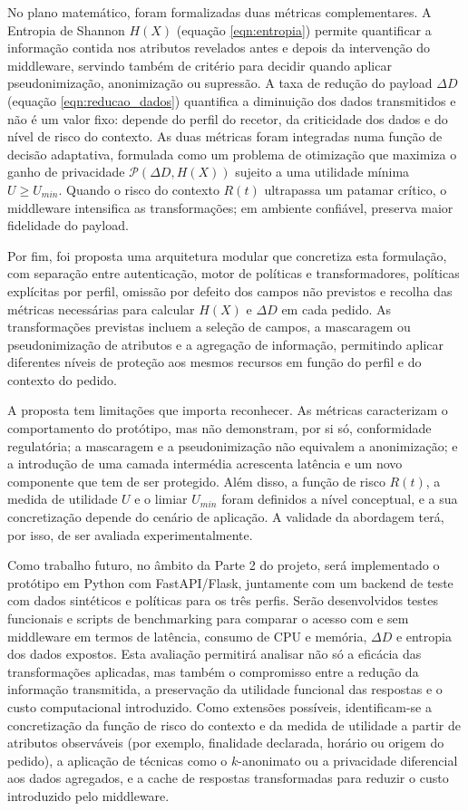 \documentclass[12pt,reqno, twoside]{amsbook}
\theoremstyle{plain}
\numberwithin{equation}{chapter}
\numberwithin{table}{chapter}
\numberwithin{figure}{chapter}
\numberwithin{section}{chapter}
\begin{document}
\noindent No plano matemático, foram formalizadas duas métricas complementares. A Entropia de Shannon $H(X)$ (equação \ref{eqn:entropia}) permite quantificar a informação contida nos atributos revelados antes e depois da intervenção do middleware, servindo também de critério para decidir quando aplicar pseudonimização, anonimização ou supressão. A taxa de redução do payload $\Delta D$ (equação \ref{eqn:reducao_dados}) quantifica a diminuição dos dados transmitidos e não é um valor fixo: depende do perfil do recetor, da criticidade dos dados e do nível de risco do contexto. As duas métricas foram integradas numa função de decisão adaptativa, formulada como um problema de otimização que maximiza o ganho de privacidade $\mathcal{P}(\Delta D, H(X))$ sujeito a uma utilidade mínima $U \ge U_{min}$. Quando o risco do contexto $R(t)$ ultrapassa um patamar crítico, o middleware intensifica as transformações; em ambiente confiável, preserva maior fidelidade do payload.

\noindent Por fim, foi proposta uma arquitetura modular que concretiza esta formulação, com separação entre autenticação, motor de políticas e transformadores, políticas explícitas por perfil, omissão por defeito dos campos não previstos e recolha das métricas necessárias para calcular $H(X)$ e $\Delta D$ em cada pedido. As transformações previstas incluem a seleção de campos, a mascaragem ou pseudonimização de atributos e a agregação de informação, permitindo aplicar diferentes níveis de proteção aos mesmos recursos em função do perfil e do contexto do pedido.

\noindent A proposta tem limitações que importa reconhecer. As métricas caracterizam o comportamento do protótipo, mas não demonstram, por si só, conformidade regulatória; a mascaragem e a pseudonimização não equivalem a anonimização; e a introdução de uma camada intermédia acrescenta latência e um novo componente que tem de ser protegido. Além disso, a função de risco $R(t)$, a medida de utilidade $U$ e o limiar $U_{min}$ foram definidos a nível conceptual, e a sua concretização depende do cenário de aplicação. A validade da abordagem terá, por isso, de ser avaliada experimentalmente.

\noindent Como trabalho futuro, no âmbito da Parte 2 do projeto, será implementado o protótipo em Python com FastAPI/Flask, juntamente com um backend de teste com dados sintéticos e políticas para os três perfis. Serão desenvolvidos testes funcionais e scripts de benchmarking para comparar o acesso com e sem middleware em termos de latência, consumo de CPU e memória, $\Delta D$ e entropia dos dados expostos. Esta avaliação permitirá analisar não só a eficácia das transformações aplicadas, mas também o compromisso entre a redução da informação transmitida, a preservação da utilidade funcional das respostas e o custo computacional introduzido. Como extensões possíveis, identificam-se a concretização da função de risco do contexto e da medida de utilidade a partir de atributos observáveis (por exemplo, finalidade declarada, horário ou origem do pedido), a aplicação de técnicas como o $k$-anonimato ou a privacidade diferencial aos dados agregados, e a cache de respostas transformadas para reduzir o custo introduzido pelo middleware.

\renewcommand{\bibname}{Referências Bibliográficas}


\end{document}
